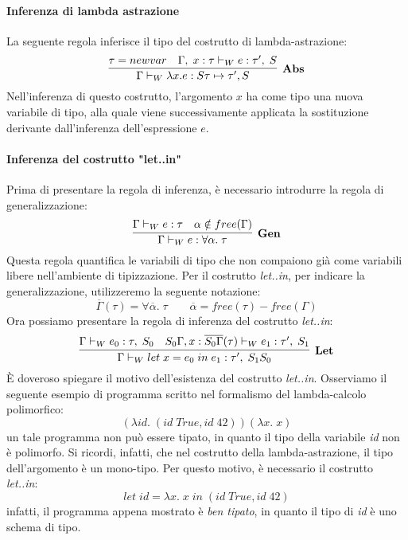 \documentclass[10pt,a4paper]{article}
\begin{document}
\paragraph{Inferenza di lambda astrazione}
La seguente regola inferisce il tipo del costrutto di lambda-astrazione:
\[ \infer[\textbf{Abs}]{\Gamma \vdash_W \lambda x. e : S\tau \mapsto \tau', S}{\tau = newvar & \Gamma, \; x : \tau \vdash_W e : \tau', \; S} \]
Nell'inferenza di questo costrutto, l'argomento $ x $ ha come tipo una nuova variabile di tipo, alla quale viene
successivamente applicata la sostituzione derivante dall'inferenza dell'espressione $ e $.

\paragraph{Inferenza del costrutto "let..in"}
Prima di presentare la regola di inferenza, è necessario introdurre la regola di generalizzazione:
\[ \infer[\textbf{Gen}]{\Gamma \vdash_W e : \forall \alpha. \; \tau}{\Gamma \vdash_W e : \tau & \alpha \notin free(\Gamma)} \]
Questa regola quantifica le variabili di tipo che non compaiono già come variabili libere nell'ambiente di tipizzazione.
Per il costrutto \textit{let..in}, per indicare la generalizzazione, utilizzeremo la seguente notazione:
\[ \overline{\Gamma}(\tau) = \forall \overline{\alpha}. \; \tau \qquad \overline{\alpha} = free(\tau) - free(\Gamma) \]
Ora possiamo presentare la regola di inferenza del costrutto \textit{let..in}:
\[ \infer[\textbf{Let}]{\Gamma \vdash_W let \; x = e_0 \; in \; e_1 : \tau', \; S_1S_0}{\Gamma \vdash_W e_0 : \tau, \; S_0 & S_0\Gamma, x : \overline{S_0\Gamma}(\tau) \vdash_W e_1 : \tau', \; S_1} \]
\`E doveroso spiegare il motivo dell'esistenza del costrutto \textit{let..in}. Osserviamo il seguente esempio di
programma scritto nel formalismo del lambda-calcolo polimorfico:
\[ (\lambda id. \; (id \; True, id \; 42)) (\lambda x. \; x) \]
un tale programma non può essere tipato, in quanto il tipo della variabile \textit{id} non è polimorfo. Si ricordi,
infatti, che nel costrutto della lambda-astrazione, il tipo dell'argomento è un mono-tipo. Per questo motivo, è
necessario il costrutto \textit{let..in}:
\[ let \; id = \lambda x. \; x \; in \; (id \; True, id \; 42) \]
infatti, il programma appena mostrato è \textit{ben tipato}, in quanto il tipo di \textit{id} è uno schema di tipo.
\end{document}
